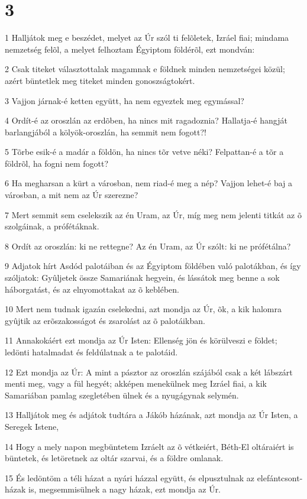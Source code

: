 \chapter{3}

\par 1 Halljátok meg e beszédet, melyet az Úr szól ti felõletek, Izráel fiai; mindama nemzetség felõl, a melyet felhoztam Égyiptom földérõl, ezt mondván:
\par 2 Csak titeket választottalak magamnak e földnek minden nemzetségei közül; azért büntetlek meg titeket minden gonoszságtokért.
\par 3 Vajjon járnak-é ketten együtt, ha nem egyeztek meg egymással?
\par 4 Ordít-é az oroszlán az erdõben, ha nincs mit ragadoznia? Hallatja-é hangját barlangjából a kölyök-oroszlán, ha semmit nem fogott?!
\par 5 Tõrbe esik-é a madár a földön, ha nincs tõr vetve néki? Felpattan-é a tõr a földrõl, ha fogni nem fogott?
\par 6 Ha megharsan a kürt a városban, nem riad-é meg a nép? Vajjon lehet-é baj a városban, a mit nem az Úr szerezne?
\par 7 Mert semmit sem cselekszik az én Uram, az Úr, míg meg nem jelenti titkát az õ szolgáinak, a prófétáknak.
\par 8 Ordít az oroszlán: ki ne rettegne? Az én Uram, az Úr szólt: ki ne prófétálna?
\par 9 Adjatok hírt Asdód palotáiban és az Égyiptom földében való palotákban, és így szóljatok: Gyûljetek össze Samariának hegyein, és lássátok meg benne a sok háborgatást, és az elnyomottakat az õ keblében.
\par 10 Mert nem tudnak igazán cselekedni, azt mondja az Úr, õk, a kik halomra gyûjtik az erõszakosságot és zsarolást az õ palotáikban.
\par 11 Annakokáért ezt mondja az Úr Isten: Ellenség jön és körülveszi e földet; ledönti hatalmadat és feldúlatnak a te palotáid.
\par 12 Ezt mondja az Úr: A mint a pásztor az oroszlán szájából csak a két lábszárt menti meg, vagy a fül hegyét; akképen menekülnek meg Izráel fiai, a kik Samariában pamlag szegletében ülnek és a nyugágynak selymén.
\par 13 Halljátok meg és adjátok tudtára a Jákób házának, azt mondja az Úr Isten, a Seregek Istene,
\par 14 Hogy a mely napon megbüntetem Izráelt az õ vétkeiért, Béth-El oltáraiért is büntetek, és letöretnek az oltár szarvai, és a földre omlanak.
\par 15 És ledöntöm a téli házat a nyári házzal együtt, és elpusztulnak az elefántcsont-házak is, megsemmisülnek a nagy házak, ezt mondja az Úr.

